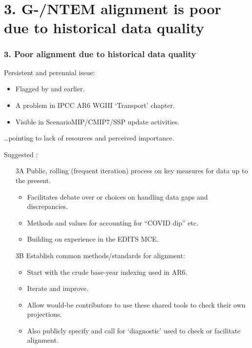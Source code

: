\documentclass[12pt,aspectratio=169]{beamer}
\begin{document}
\section{3. G-/NTEM alignment is poor due to historical data quality}
\begin{frame}[allowframebreaks]
\frametitle{3. Poor alignment due to historical data quality}
Persistent and perennial issue:
\begin{itemize}
  \item Flagged by \textcite{yeh-2016} and earlier.
  \item A problem in IPCC AR6 WGIII ‘Transport’ chapter.
  \item Visible in ScenarioMIP/CMIP7/SSP update activities.
\end{itemize}
…pointing to lack of resources and perceived importance.

\bigskip
Suggested :
\begin{enumerate}
  \item [3A] Public, rolling (frequent iteration) process on key measures for data up to the present.
    \begin{itemize}
      \item Facilitates debate over  or  choices on handling data gaps and discrepancies.
      \item Methods and values for accounting for “COVID dip” etc.
      \item Building on experience in the EDITS MCE.
    \end{itemize}
\end{enumerate}

\framebreak
\begin{enumerate}
  \item [3B] Establish common methods/standards for alignment:
    \begin{itemize}
      \item Start with the crude base-year indexing used in AR6.
      \item Iterate and improve.
      \item Allow would-be contributors to use these shared tools to check their own projections.
      \item Also publicly specify and call for ‘diagnostic’ used to check or facilitate alignment.
    \end{itemize}
\end{enumerate}

\end{frame}
\end{document}
